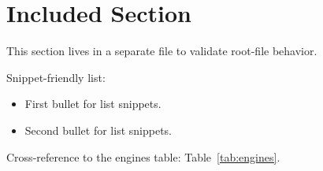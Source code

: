 
\section{Included Section}

This section lives in a separate file to validate root-file behavior.

Snippet-friendly list:
\begin{itemize}
  \item First bullet for list snippets.
  \item Second bullet for list snippets.
\end{itemize}

Cross-reference to the engines table: Table~\ref{tab:engines}.
